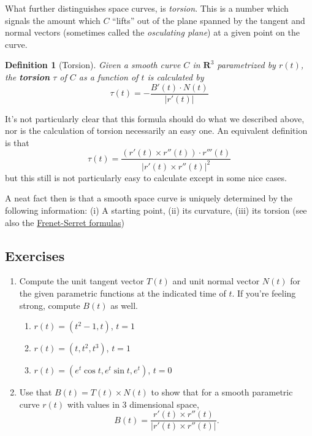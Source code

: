 \documentclass[12pt]{article}
\numberwithin{equation}{subsection}
\numberwithin{figure}{subsection}
\newtheorem{defn}[subsection]{Definition}
\theoremstyle{note}
\begin{document}
{What further distinguishes space curves, is \textit{torsion}. This is a number which signals the amount which $C$ ``lifts'' out of the plane spanned by the tangent and normal vectors (sometimes called the \textit{osculating plane}) at a given point on the curve. 
\begin{defn}[Torsion] Given a smooth curve $C$ in $\mathbf{R}^3$ parametrized by $r(t)$, the \textbf{torsion} $\tau$ of $C$ as a function of $t$ is calculated by \begin{equation} \label{t1} 
	\tau(t)=- \dfrac{B'(t)\cdot N(t)}{|r'(t)|}\end{equation}
\end{defn}
It's not particularly clear that this formula should do what we described above, nor is the calculation of torsion necessarily an easy one. An equivalent definition is that \begin{equation} \tau(t)= \dfrac{ (r'(t) \times r''(t)) \cdot r'''(t)}{|r'(t)\times r''(t)|^2}\end{equation}
but this still is not particularly easy to calculate except in some nice cases.

A neat fact then is that a smooth space curve is uniquely determined by the following information: (i) A starting point, (ii) its curvature, (iii) its torsion (see also the  \href{https://en.wikipedia.org/wiki/Frenet\%E2\%80\%93Serret_formulas}{Frenet-Serret formulas})

\subsection{Exercises}
\begin{enumerate}[label=\arabic*.]
\item Compute the unit tangent vector $T(t)$ and unit normal vector $N(t)$ for the given parametric functions at the indicated time of $t$. If you're feeling strong, compute $B(t)$ as well.

\begin{enumerate} 
	\item $r(t)=(t^2-1, t)$, $t=1$
	\item $r(t)=(t, t^2, t^3)$, $t=1$
	\item $r(t)=(e^t \cos t, e^t \sin t, e^t)$, $t=0$
\end{enumerate}

\item Use that $B(t)=T(t) \times N(t)$ to show that for a smooth parametric curve $r(t)$ with values in 3 dimensional space, \begin{equation} B(t)=\dfrac{ r'(t) \times r''(t)} {|r'(t) \times r''(t)|}.\end{equation}


\end{enumerate}}
\end{document}
